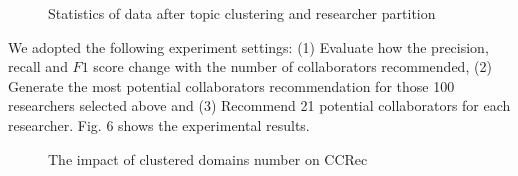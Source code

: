 \documentclass[review]{elsarticle}
\begin{document}
\begin{figure}
\centering
{}
\caption{Statistics of data after topic clustering and researcher partition}
\label{fig:5}
\end{figure}

We adopted the following experiment settings: (1) Evaluate how the precision, recall and $F1$ score change with the number of collaborators recommended, (2) Generate the most potential collaborators recommendation for those 100 researchers selected above and (3) Recommend 21 potential collaborators for each researcher. Fig. 6 shows the experimental results.

\begin{figure}
\centering
{}
\caption{The impact of clustered domains number on CCRec}
\label{fig:6}
\end{figure}
\end{document}

